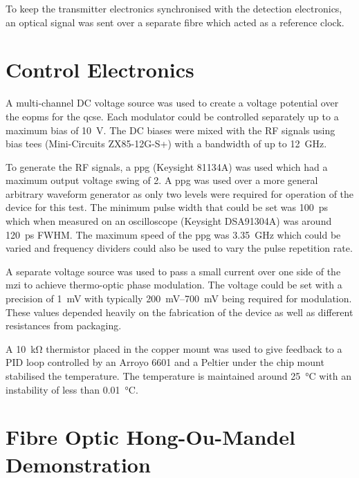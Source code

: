 To keep the transmitter electronics synchronised with the detection electronics, an optical signal was sent over a separate fibre which acted as a reference clock. 

\section{Control Electronics}



A multi-channel DC voltage source was used to create a voltage potential over the \acp{eopm} for the \ac{qcse}. Each modulator could be controlled separately up to a maximum bias of \SI{10}{V}. The DC biases were mixed with the RF signals using bias tees (Mini-Circuits ZX85-12G-S+) with a bandwidth of up to \SI{12}{GHz}. 

To generate the RF signals, a \ac{ppg} (Keysight 81134A) was used which had a maximum output voltage swing of \SI{2}{\Vpp}. A \ac{ppg} was used over a more general arbitrary waveform generator as only two levels were required for operation of the device for this test. The minimum pulse width that could be set was \SI{100}{\ps} which when measured on an oscilloscope (Keysight DSA91304A) was around \SI{120}{\ps} \ac{FWHM}. The maximum speed of the \ac{ppg} was \SI{3.35}{\GHz} which could be varied and frequency dividers could also be used to vary the pulse repetition rate. 

A separate voltage source was used to pass a small current over one side of the \ac{mzi} to achieve thermo-optic phase modulation. The voltage could be set with a precision of \SI{1}{\mV} with typically \SIrange{200}{700}{\mV} being required for modulation. These values depended heavily on the fabrication of the device as well as different resistances from packaging.

A \SI{10}{\kilo\ohm} thermistor placed in the copper mount was used to give feedback to a PID loop controlled by an Arroyo 6601 and a Peltier under the chip mount stabilised the temperature. The temperature is maintained around \SI{25}{\celsius} with an instability of less than \SI{0.01}{\celsius}. 

\section{Fibre Optic Hong-Ou-Mandel Demonstration}

